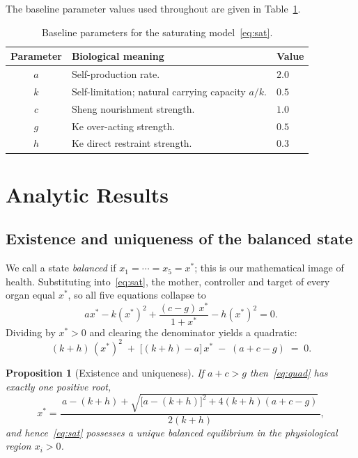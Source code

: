 \documentclass[11pt]{article}
\newtheorem{proposition}[theorem]{Proposition}
\begin{document}
\medskip
The baseline parameter values used throughout are given in
Table~\ref{tab:params}.

\begin{table}[!htb]
\centering
\begin{tabular}{c p{7.4cm} l}
\toprule
Parameter & Biological meaning & Value \\
\midrule
$a$ & Self-production rate. & $2.0$ \\[2pt]
$k$ & Self-limitation; natural carrying capacity $a/k$. & $0.5$ \\[2pt]
$c$ & Sheng nourishment strength. & $1.0$ \\[2pt]
$g$ & Ke over-acting strength. & $0.5$ \\[2pt]
$h$ & Ke direct restraint strength. & $0.3$ \\
\bottomrule
\end{tabular}
\caption{Baseline parameters for the saturating model~\eqref{eq:sat}.}
\label{tab:params}
\end{table}

\section{Analytic Results}\label{sec:analysis}

\subsection{Existence and uniqueness of the balanced state}

We call a state \emph{balanced} if $x_1=\cdots=x_5=x^\ast$; this is our
mathematical image of health. Substituting into~\eqref{eq:sat}, the mother,
controller and target of every organ equal $x^\ast$, so all five equations
collapse to
\[
a x^\ast - k (x^\ast)^2 + \frac{(c-g)\,x^\ast}{1+x^\ast} - h (x^\ast)^2 = 0 .
\]
Dividing by $x^\ast>0$ and clearing the denominator yields a quadratic:
\begin{equation}\label{eq:quad}
(k+h)\,(x^\ast)^2 \;+\; \bigl[(k+h)-a\bigr]\,x^\ast \;-\;(a+c-g) \;=\; 0 .
\end{equation}

\begin{proposition}[Existence and uniqueness]\label{prop:exist}
If $a+c>g$ then~\eqref{eq:quad} has exactly one positive root,
\[
x^\ast =
\frac{\,a-(k+h)+\sqrt{\bigl[a-(k+h)\bigr]^2+4(k+h)(a+c-g)}\,}{2(k+h)},
\]
and hence~\eqref{eq:sat} possesses a unique balanced equilibrium in the
physiological region $x_i>0$.
\end{proposition}
\end{document}

